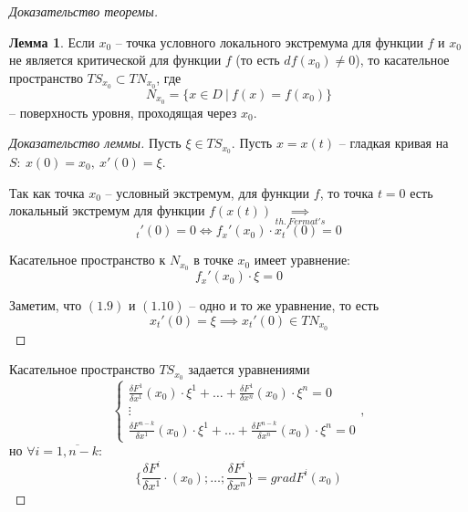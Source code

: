 \documentclass{report}
\theoremstyle{definition}
\newtheorem{lemma}{Лемма}[section]
\begin{document}
\begin{proof}[Доказательство теоремы]
  \begin{lemma}
    Если $x_0$ -- точка условного локального экстремума для функции $f$ и $x_0$ не является критической для функции $f$ (то есть $df(x_0)\ne0$), то касательное пространство $TS_{x_0}\subset TN_{x_0}$, где
    \begin{equation*}
      N_{x_0} = \{x \in D \ \big| \ f(x) = f(x_0)\}
    \end{equation*} -- поверхность уровня, проходящая через $x_0$.
  \end{lemma}

  \begin{proof}[Доказательство леммы]
    Пусть $\xi \in TS_{x_0}$. Пусть $x = x(t)$ -- гладкая кривая на $S: \ x(0) = x_0, \ x'(0) = \xi$.

    Так как точка $x_0$ -- условный экстремум, для функции $f$, то точка $t = 0$ есть локальный экстремум для функции $f(x(t)) \underset{th. \ Fermat's}{\implies}$
    \begin{equation}
      [f(x(t))]_t'(0) = 0 \iff
      f_x'(x_0) \cdot x_t'(0) = 0
    \end{equation}

    Касательное пространство к $N_{x_0}$ в точке $x_0$ имеет уравнение:
    \begin{equation}
      f_x'(x_0)\cdot \xi = 0
    \end{equation}

    Заметим, что $(1.9)$ и $(1.10)$ -- одно и то же уравнение, то есть
    \begin{equation*}
      x_t'(0) = \xi \implies x_t'(0) \in TN_{x_0}
    \end{equation*}
  \end{proof}

  Касательное пространство $TS_{x_0}$ задается уравнениями
  \begin{equation}
    \left\{\begin{array}{l}
      \frac{\delta F^1}{\delta x^1}(x_0)\cdot \xi^1 + \ldots + \frac{\delta F^1}{\delta x^n}(x_0) \cdot \xi^n = 0 \\
      \vdots                                                                                                      \\
      \frac{\delta F^{n-k}}{\delta x^1}(x_0)\cdot \xi^1 + \ldots + \frac{\delta F^{n-k}}{\delta x^n}(x_0) \cdot \xi^n = 0
    \end{array}\right.,
  \end{equation}
  но $\forall i = \overline{1,n-k}:$
  \begin{equation*}
    \bigg\{\frac{\delta F^i}{\delta x^1}\cdot (x_0);\ldots;\frac{\delta F^i}{\delta x^n}\bigg\} = grad F^i(x_0)
  \end{equation*}


\end{proof}
\end{document}

